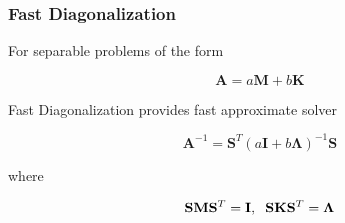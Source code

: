 \documentclass{beamer}
\begin{document}

\begin{frame}
\begin{center}
\frametitle{Fast Diagonalization}

For separable problems of the form

\vspace{-4mm}

\begin{equation}
\mathbf{A} = a \mathbf{M} + b \mathbf{K}
\end{equation}

Fast Diagonalization provides fast approximate solver

\vspace{-4mm}

\begin{equation}
\mathbf{A}^{-1} = \mathbf{S}^T \left( a \mathbf{I} + b \boldsymbol{\Lambda} \right)^{-1} \mathbf{S}
\label{eq:fdminverse}
\end{equation}

where

\vspace{-4mm}

\begin{equation}
\mathbf{S} \mathbf{M} \mathbf{S}^T = \mathbf{I}, \hspace{2mm} \mathbf{S} \mathbf{K} \mathbf{S}^T = \boldsymbol{\Lambda}
\end{equation}

\end{center}
\end{frame}

\end{document}

